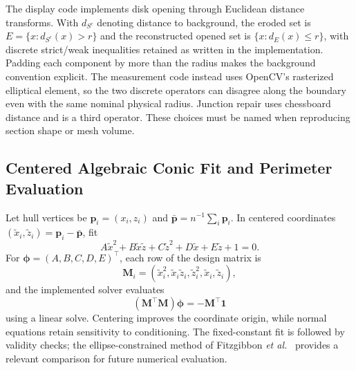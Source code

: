 \documentclass[11pt,a4paper]{article}
\numberwithin{equation}{section}
\begin{document}
The display code implements disk opening through Euclidean distance transforms. With $d_{S^c}$ denoting distance to background, the eroded set is $E=\{x:d_{S^c}(x)>r\}$ and the reconstructed opened set is $\{x:d_E(x)\le r\}$, with discrete strict/weak inequalities retained as written in the implementation. Padding each component by more than the radius makes the background convention explicit. The measurement code instead uses OpenCV's rasterized elliptical element, so the two discrete operators can disagree along the boundary even with the same nominal physical radius. Junction repair uses chessboard distance and is a third operator. These choices must be named when reproducing section shape or mesh volume.

\subsection{Centered Algebraic Conic Fit and Perimeter Evaluation}
\label{subsec:conic_fit}
Let hull vertices be $\mathbf p_i=(x_i,z_i)$ and $\bar{\mathbf p}=n^{-1}\sum_i\mathbf p_i$. In centered coordinates $(\tilde x_i,\tilde z_i)=\mathbf p_i-\bar{\mathbf p}$, fit
\begin{equation}
A\tilde x^2+B\tilde x\tilde z+C\tilde z^2+D\tilde x+E\tilde z+1=0.
\end{equation}
For $\boldsymbol\phi=(A,B,C,D,E)^\top$, each row of the design matrix is
\begin{equation}
\mathbf M_i=(\tilde x_i^2,\tilde x_i\tilde z_i,\tilde z_i^2,\tilde x_i,\tilde z_i),
\end{equation}
and the implemented solver evaluates
\begin{equation}
(\mathbf M^\top\mathbf M)\boldsymbol\phi=-\mathbf M^\top\mathbf 1
\label{eq:conic_normal_equations}
\end{equation}
using a linear solve. Centering improves the coordinate origin, while normal equations retain sensitivity to conditioning. The fixed-constant fit is followed by validity checks; the ellipse-constrained method of Fitzgibbon \emph{et al.}~\cite{fitzgibbon1999direct} provides a relevant comparison for future numerical evaluation.
\end{document}
